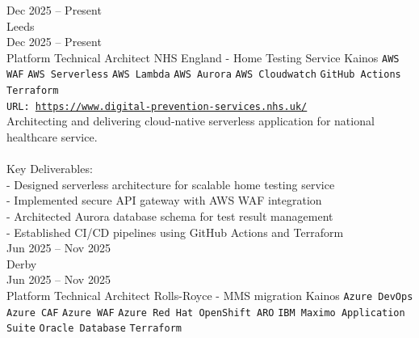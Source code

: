 \documentclass[9pt]{style/developercv}
\begin{document}

\begin{entrylist}
    \entry
    {Dec 2025 -- Present\\\footnotesize{Leeds}
    \\Dec 2025  -- Present\\\footnotesize{Platform Technical Architect}}
        {NHS England - Home Testing Service}
        {Kainos}
        {
      \texttt{AWS WAF}\slashsep
      \texttt{AWS Serverless}\slashsep
      \texttt{AWS Lambda}\slashsep
      \texttt{AWS Aurora}\slashsep
      \texttt{AWS Cloudwatch}\slashsep
      \texttt{GitHub Actions}\slashsep
      \texttt{Terraform}\\
      \texttt{URL: \underline{https://www.digital-prevention-services.nhs.uk/}}\\

      Architecting and delivering cloud-native serverless application for national healthcare service.\\
      \\
      Key Deliverables:\\
      - Designed serverless architecture for scalable home testing service\\
      - Implemented secure API gateway with AWS WAF integration\\
      - Architected Aurora database schema for test result management\\
      - Established CI/CD pipelines using GitHub Actions and Terraform\\
        }
    \entry
    {Jun 2025 -- Nov 2025\\\footnotesize{Derby}
    \\Jun 2025  -- Nov 2025\\\footnotesize{Platform Technical Architect}}
        {Rolls-Royce - MMS migration}
        {Kainos}
        {
      \texttt{Azure DevOps}\slashsep
      \texttt{Azure CAF}\slashsep
      \texttt{Azure WAF}\slashsep
      \texttt{Azure Red Hat OpenShift ARO}\slashsep
      \texttt{IBM Maximo Application Suite}\slashsep
      \texttt{Oracle Database}\slashsep
      \texttt{Terraform}\\

}
\end{entrylist}
\end{document}
